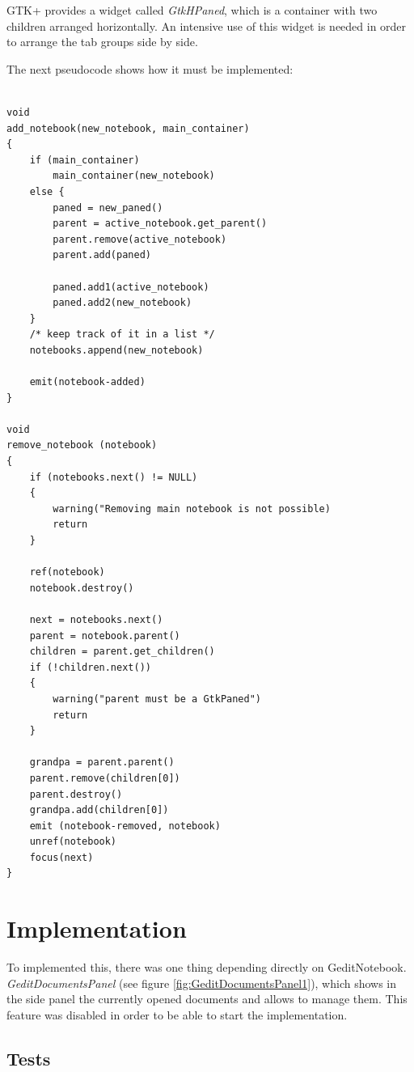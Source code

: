 GTK+ provides a widget called \emph{GtkHPaned}, which is a container with two children arranged horizontally. An intensive use of this widget is needed in order to arrange the tab groups side by side.

The next pseudocode shows how it must be implemented:
\begin{lstlisting}[style=GObject]

void
add_notebook(new_notebook, main_container)
{
	if (main_container)
		main_container(new_notebook)
	else {
		paned = new_paned()
		parent = active_notebook.get_parent()
		parent.remove(active_notebook)
		parent.add(paned)

		paned.add1(active_notebook)
		paned.add2(new_notebook)
	}
	/* keep track of it in a list */
	notebooks.append(new_notebook)

	emit(notebook-added)
}

void
remove_notebook (notebook)
{
	if (notebooks.next() != NULL)
	{
		warning("Removing main notebook is not possible)
		return
	}

	ref(notebook)
	notebook.destroy()

	next = notebooks.next()
	parent = notebook.parent()
	children = parent.get_children()
	if (!children.next())
	{
		warning("parent must be a GtkPaned")
		return
	}

	grandpa = parent.parent()
	parent.remove(children[0])
	parent.destroy()
	grandpa.add(children[0])
	emit (notebook-removed, notebook)
	unref(notebook)
	focus(next)
}

\end{lstlisting}

\newpage
\section{Implementation}

To implemented this, there was one thing depending directly on GeditNotebook. \emph{GeditDocumentsPanel} (see figure \ref{fig:GeditDocumentsPanel1}), which shows in the side panel the currently opened documents and allows to manage them. This feature was disabled in order to be able to start the implementation.


\subsection{Tests}

